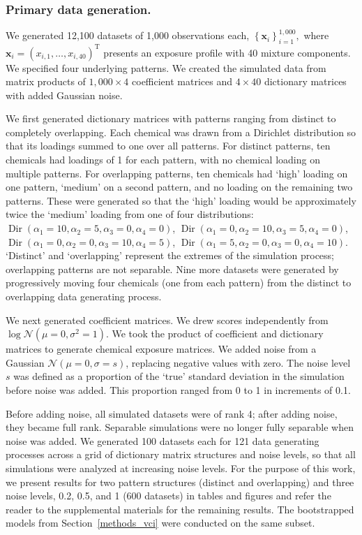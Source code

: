 \subsubsection{Primary data generation.} 
We generated 12,100 datasets of 1,000 observations each, $\left\{\mathbf{x}_{i}\right\}_{i=1}^{1,000},$ where $\mathbf{x}_{i} = \left(x_{i,1}, \ldots, x_{i,40}\right)^{\mathrm{T}}$ presents an exposure profile with 40 mixture components. We specified four underlying patterns. We created the simulated data from matrix products of $1,000 \times 4$ coefficient matrices and $4 \times 40$ dictionary matrices with added Gaussian noise.

We first generated dictionary matrices with patterns ranging from distinct to completely overlapping. Each chemical was drawn from a Dirichlet distribution so that its loadings summed to one over all patterns. For distinct patterns, ten chemicals had loadings of 1 for each pattern, with no chemical loading on multiple patterns. For overlapping patterns, ten chemicals had `high' loading on one pattern, `medium' on a second pattern, and no loading on the remaining two patterns. These were generated so that the `high' loading would be approximately twice the `medium' loading from one of four distributions: $\operatorname{Dir}(\alpha_1=10, \alpha_2=5, \alpha_3=0, \alpha_4=0)$, $\operatorname{Dir}(\alpha_1=0, \alpha_2=10, \alpha_3=5, \alpha_4=0)$, $\operatorname{Dir}(\alpha_1=0, \alpha_2=0, \alpha_3=10, \alpha_4=5)$, $\operatorname{Dir}(\alpha_1=5, \alpha_2=0, \alpha_3=0, \alpha_4=10)$. `Distinct' and `overlapping' represent the extremes of the simulation process; overlapping patterns are not separable. Nine more datasets were generated by progressively moving four chemicals (one from each pattern) from the distinct to overlapping data generating process.

We next generated coefficient matrices. We drew scores independently from $\log\mathcal{N}(\mu = 0, \sigma^{2} = 1)$. We took the product of coefficient and dictionary matrices to generate chemical exposure matrices. We added noise from a Gaussian $\mathcal{N}(\mu = 0, \sigma = s)$, replacing negative values with zero. The noise level $s$ was defined as a proportion of the `true' standard deviation in the simulation before noise was added. This proportion ranged from 0 to 1 in increments of 0.1. 

Before adding noise, all simulated datasets were of rank 4; after adding noise, they became full rank. Separable simulations were no longer fully separable when noise was added. We generated 100 datasets each for 121 data generating processes across a grid of dictionary matrix structures and noise levels, so that all simulations were analyzed at increasing noise levels. For the purpose of this work, we present results for two pattern structures (distinct and overlapping) and three noise levels, 0.2, 0.5, and 1 (600 datasets) in tables and figures and refer the reader to the supplemental materials for the remaining results. The bootstrapped models from Section~\ref{methods_vci} were conducted on the same subset.


